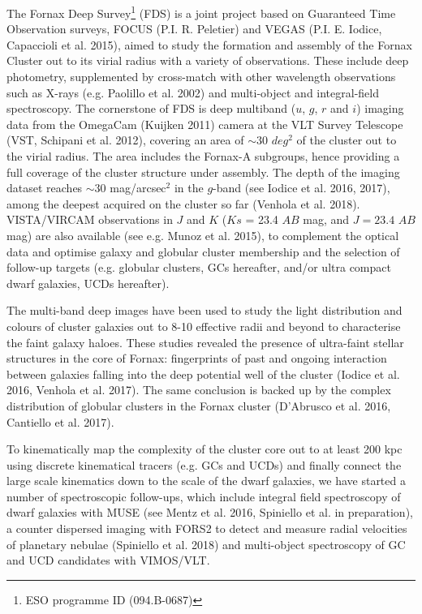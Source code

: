 \documentclass[useAMS,usenatbib]{mn2e}
\begin{document}
The Fornax Deep Survey\footnote{ESO programme ID (094.B-0687)} (FDS) is a joint project based on Guaranteed Time Observation surveys, FOCUS (P.I. R. Peletier) and VEGAS (P.I. E. Iodice, Capaccioli et al. 2015), aimed to study the formation and assembly of the Fornax Cluster out to its virial radius with a variety of observations. These include
deep photometry, supplemented by cross-match with other wavelength observations such as  X-rays (e.g. Paolillo et al. 2002) and multi-object and integral-field spectroscopy.
The cornerstone of FDS is deep multiband ($u$, $g$, $r$ and $i$) imaging data from the OmegaCam (Kuijken 2011) camera at the VLT Survey Telescope (VST, Schipani et al. 2012), covering an area of $\sim30$ $deg^2$ of the cluster out to the virial radius. The area includes the Fornax-A subgroups, hence providing a full coverage of the cluster structure under assembly.  The depth of the imaging dataset reaches $\sim 30$ mag/arcsec$^2$ in the $g$-band (see Iodice et al. 2016, 2017), among the deepest acquired on the cluster so far (Venhola et al. 2018). VISTA/VIRCAM observations in $J$ and $K$ ($Ks$ = 23.4 $AB$ mag, and $J = 23.4$ $AB$ mag) are also available (see e.g. Munoz et al. 2015), to complement the optical data and optimise galaxy and globular cluster membership and the selection of follow-up targets (e.g. globular clusters, GCs hereafter, and/or ultra compact dwarf galaxies, UCDs hereafter). 

The multi-band deep images have been used to study the light distribution and colours of cluster galaxies out to 8-10 effective radii and beyond to characterise the faint galaxy haloes. These studies revealed the presence of ultra-faint stellar structures in the core of Fornax: fingerprints of past and ongoing interaction between galaxies falling into the deep potential well of the cluster (Iodice et al. 2016, Venhola et al. 2017). The same conclusion is backed up by the complex distribution of globular clusters in the Fornax cluster (D’Abrusco et al. 2016, Cantiello et al. 2017).

To kinematically map the complexity of the cluster core out to at least 200 kpc using discrete kinematical tracers (e.g. GCs and UCDs) and finally connect the large scale kinematics down to the scale of the dwarf galaxies, we have started a number of spectroscopic follow-ups, which include integral field spectroscopy of dwarf galaxies with MUSE (see Mentz et al. 2016, Spiniello et al. in preparation), a counter dispersed imaging with FORS2 to detect and measure radial velocities of planetary nebulae (Spiniello et al. 2018) and multi-object spectroscopy of GC and UCD candidates with VIMOS/VLT.
\end{document}
